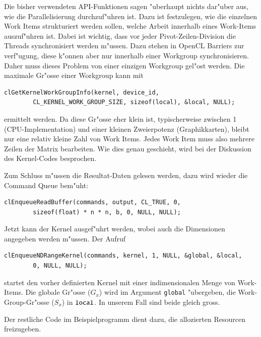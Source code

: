 Die bisher verwendeten API-Funktionen sagen "uberhaupt nichts dar"uber
aus, wie die Parallelisierung durchzuf"uhren ist. Dazu ist festzulegen,
wie die einzelnen Work Items strukturiert werden sollen, welche Arbeit
innerhalb eines Work-Items auszuf"uhren ist.
Dabei ist wichtig, dass vor jeder Pivot-Zeilen-Division die Threads
synchronisiert werden m"ussen. Dazu stehen in OpenCL Barriers
zur verf"ugung, diese k"onnen aber nur innerhalb einer Workgroup
synchronisieren. Daher muss dieses Problem von einer einzigen Workgroup
gel"ost werden. Die maximale Gr"osse einer Workgroup kann mit
\begin{verbatim}
clGetKernelWorkGroupInfo(kernel, device_id,
        CL_KERNEL_WORK_GROUP_SIZE, sizeof(local), &local, NULL);
\end{verbatim}
ermittelt werden.
Da diese Gr"osse eher klein ist, typischerweise
zwischen 1 (CPU-Implementation) und einer kleinen Zweierpotenz
(Graphikkarten), bleibt nur eine relativ kleine Zahl von Work Items.
Jedes Work Item muss also mehrere Zeilen der Matrix bearbeiten.
Wie dies genau geschieht, wird bei der Diskussion des Kernel-Codes
besprochen.

Zum Schluss m"ussen die Resultat-Daten gelesen werden, dazu wird wieder
die Command Queue bem"uht:
\begin{verbatim}
clEnqueueReadBuffer(commands, output, CL_TRUE, 0,
        sizeof(float) * n * n, b, 0, NULL, NULL);
\end{verbatim}

Jetzt kann der Kernel ausgef"uhrt werden, wobei auch die Dimensionen
angegeben werden m"ussen. Der Aufruf
\begin{verbatim}
clEnqueueNDRangeKernel(commands, kernel, 1, NULL, &global, &local,
        0, NULL, NULL);
\end{verbatim}
startet den vorher definierten Kernel mit einer indimensionalen
Menge von Work-Items. Die globale Gr"osse ($G_x$) wird im
Argument \verb+global+ "ubergeben, die Work-Group-Gr"osse ($S_x$)
in $\verb+local+$. In unserem Fall sind beide gleich gross.

Der restliche Code im Beispielprogramm dient dazu, die allozierten
Resourcen freizugeben.

